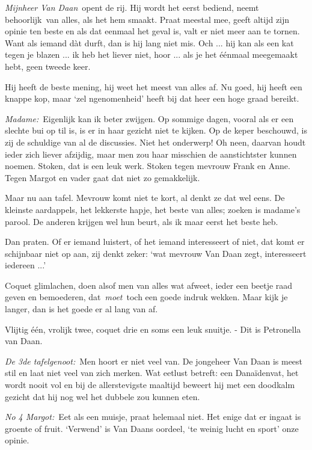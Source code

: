 \documentclass{book}
\begin{document}
\emph{Mijnheer Van Daan}~opent de rij. Hij wordt het eerst bediend,
neemt behoorlijk~van alles, als het hem smaakt. Praat meestal mee, geeft
altijd zijn opinie ten beste en als dat eenmaal het geval is, valt er
niet meer aan te tornen. Want als iemand dàt durft, dan is hij lang niet
mis. Och ... hij kan als een kat tegen je blazen ... ik heb het liever
niet, hoor ... als je het éénmaal meegemaakt hebt, geen tweede keer.

Hij heeft de beste mening, hij weet het meest van alles af. Nu goed, hij
heeft een knappe kop, maar `zel ngenomenheid' heeft bij dat heer een
hoge graad bereikt.

\emph{Madame:}~Eigenlijk kan ik beter zwijgen. Op sommige dagen, vooral
als er een slechte bui op til is, is er in haar gezicht niet te kijken.
Op de keper beschouwd, is zij de schuldige van al de discussies. Niet
het onderwerp! Oh neen, daarvan houdt ieder zich liever afzijdig, maar
men zou haar misschien de aanstichtster kunnen noemen. Stoken, dat is
een leuk werk. Stoken tegen mevrouw Frank en Anne. Tegen Margot en vader
gaat dat niet zo gemakkelijk.

Maar nu aan tafel. Mevrouw komt niet te kort, al denkt ze dat wel eens.
De kleinste aardappels, het lekkerste hapje, het beste van alles; zoeken
is madame's parool. De anderen krijgen wel hun beurt, als ik maar eerst
het beste heb.

Dan praten. Of er iemand luistert, of het iemand interesseert of niet,
dat komt er schijnbaar niet op aan, zij denkt zeker: `wat mevrouw Van
Daan zegt, interesseert iedereen ...'

Coquet glimlachen, doen alsof men van alles wat afweet, ieder een beetje
raad geven en bemoederen, dat~\emph{moet}~toch een goede indruk wekken.
Maar kijk je langer, dan is het goede er al lang van af.

Vlijtig één, vrolijk twee, coquet drie en soms een leuk snuitje. - Dit
is Petronella van Daan.

\emph{De 3de tafelgenoot:}~Men hoort er niet veel van. De jongeheer Van
Daan is meest stil en laat niet veel van zich merken. Wat eetlust
betreft: een Danaïdenvat, het wordt nooit vol en bij de allerstevigste
maaltijd beweert hij met een doodkalm gezicht dat hij nog wel het
dubbele zou kunnen eten.

\emph{No 4 Margot:}~Eet als een muisje, praat helemaal niet. Het enige
dat er ingaat is groente of fruit. `Verwend' is Van Daans oordeel, `te
weinig lucht en sport' onze opinie.
\end{document}
